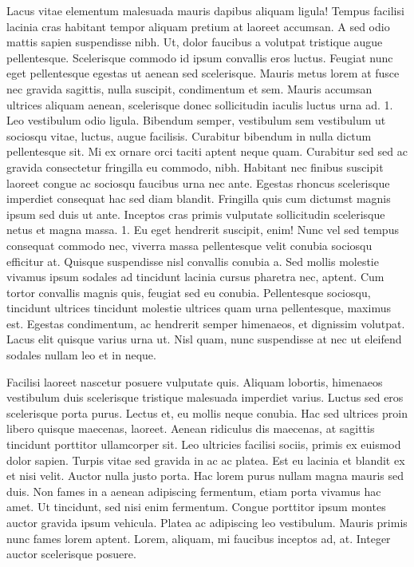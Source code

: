 \documentclass[11pt,]{article}
\begin{document}
Lacus vitae elementum malesuada mauris dapibus aliquam ligula! Tempus
facilisi lacinia cras habitant tempor aliquam pretium at laoreet
accumsan. A sed odio mattis sapien suspendisse nibh. Ut, dolor faucibus
a volutpat tristique augue pellentesque. Scelerisque commodo id ipsum
convallis eros luctus. Feugiat nunc eget pellentesque egestas ut aenean
sed scelerisque. Mauris metus lorem at fusce nec gravida sagittis, nulla
suscipit, condimentum et sem. Mauris accumsan ultrices aliquam aenean,
scelerisque donec sollicitudin iaculis luctus urna ad. 1. Leo vestibulum
odio ligula. Bibendum semper, vestibulum sem vestibulum ut sociosqu
vitae, luctus, augue facilisis. Curabitur bibendum in nulla dictum
pellentesque sit. Mi ex ornare orci taciti aptent neque quam. Curabitur
sed sed ac gravida consectetur fringilla eu commodo, nibh. Habitant nec
finibus suscipit laoreet congue ac sociosqu faucibus urna nec ante.
Egestas rhoncus scelerisque imperdiet consequat hac sed diam blandit.
Fringilla quis cum dictumst magnis ipsum sed duis ut ante. Inceptos cras
primis vulputate sollicitudin scelerisque netus et magna massa. 1. Eu
eget hendrerit suscipit, enim! Nunc vel sed tempus consequat commodo
nec, viverra massa pellentesque velit conubia sociosqu efficitur at.
Quisque suspendisse nisl convallis conubia a. Sed mollis molestie
vivamus ipsum sodales ad tincidunt lacinia cursus pharetra nec, aptent.
Cum tortor convallis magnis quis, feugiat sed eu conubia. Pellentesque
sociosqu, tincidunt ultrices tincidunt molestie ultrices quam urna
pellentesque, maximus est. Egestas condimentum, ac hendrerit semper
himenaeos, et dignissim volutpat. Lacus elit quisque varius urna ut.
Nisl quam, nunc suspendisse at nec ut eleifend sodales nullam leo et in
neque.

Facilisi laoreet nascetur posuere vulputate quis. Aliquam lobortis,
himenaeos vestibulum duis scelerisque tristique malesuada imperdiet
varius. Luctus sed eros scelerisque porta purus. Lectus et, eu mollis
neque conubia. Hac sed ultrices proin libero quisque maecenas, laoreet.
Aenean ridiculus dis maecenas, at sagittis tincidunt porttitor
ullamcorper sit. Leo ultricies facilisi sociis, primis ex euismod dolor
sapien. Turpis vitae sed gravida in ac ac platea. Est eu lacinia et
blandit ex et nisi velit. Auctor nulla justo porta. Hac lorem purus
nullam magna mauris sed duis. Non fames in a aenean adipiscing
fermentum, etiam porta vivamus hac amet. Ut tincidunt, sed nisi enim
fermentum. Congue porttitor ipsum montes auctor gravida ipsum vehicula.
Platea ac adipiscing leo vestibulum. Mauris primis nunc fames lorem
aptent. Lorem, aliquam, mi faucibus inceptos ad, at. Integer auctor
scelerisque posuere.
\end{document}
